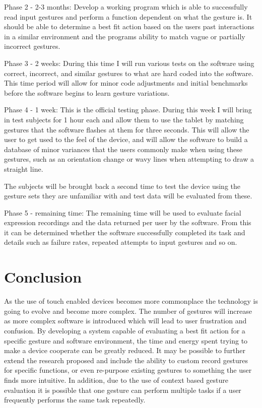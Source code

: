 \documentclass[11pt]{article}
\begin{document}
Phase 2 - 2-3 months: Develop a working program which is able to successfully read input gestures and perform a function dependent on what the gesture is. It should be able to determine a best fit action based on the users past interactions in a similar environment and the programs ability to match vague or partially incorrect gestures.

Phase 3 - 2 weeks: During this time I will run various tests on the software using correct, incorrect, and similar gestures to what are hard coded into the software. This time period will allow for minor code adjustments and initial benchmarks before the software begins to learn gesture variations.

Phase 4 - 1 week: This is the official testing phase. During this week I will bring in test subjects for 1 hour each and allow them to use the tablet by matching gestures that the software flashes at them for three seconds. This will allow the user to get used to the feel of the device, and will allow the software to build a database of minor variances that the users commonly make when using these gestures, such as an orientation change or wavy lines when attempting to draw a straight line.

The subjects will be brought back a second time to test the device using the gesture sets they are unfamiliar with and test data will be evaluated from these.

Phase 5 - remaining time: The remaining time will be used to evaluate facial expression recordings and the data returned per user by the software. From this it can be determined whether the software successfully completed its task and details such as failure rates, repeated attempts to input gestures and so on.

\vspace*{-.1in}
\section{Conclusion}
\label{sec:conclusion}
\vspace*{-.1in}

As the use of touch enabled devices becomes more commonplace the technology is going to evolve and become more complex. The number of gestures will increase as more complex software is introduced which will lead to user frustration and confusion. By developing a system capable of evaluating a best fit action for a specific gesture and software environment, the time and energy spent trying to make a device cooperate can be greatly reduced. It may be possible to further extend the research proposed and include the ability to custom record gestures for specific functions, or even re-purpose existing gestures to something the user finds more intuitive. In addition, due to the use of context based gesture evaluation it is possible that one gesture can perform multiple tasks if a user frequently performs the same task repeatedly. 



\end{document}
